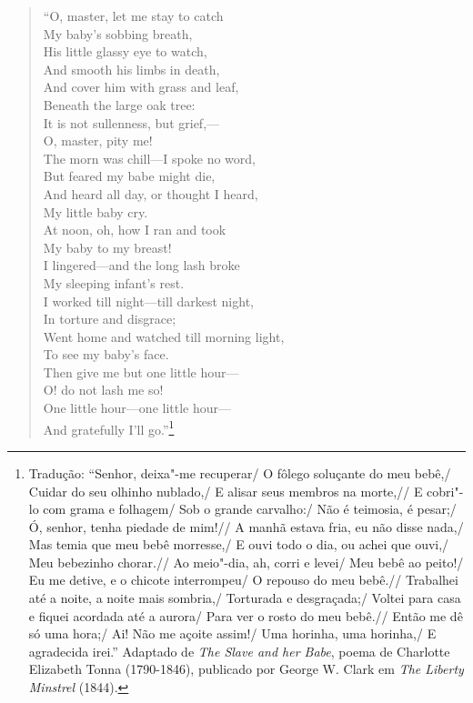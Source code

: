 \begin{verse}
``O, master, let me stay to catch\\
My baby's sobbing breath,\\
His little glassy eye to watch,\\
And smooth his limbs in death,\\[5pt]

And cover him with grass and leaf,\\
Beneath the large oak tree:\\
It is not sullenness, but grief,---\\
O, master, pity me!\\[5pt]

The morn was chill---I spoke no word,\\
But feared my babe might die,\\
And heard all day, or thought I heard,\\
My little baby cry.\\[5pt]

At noon, oh, how I ran and took\\
My baby to my breast!\\
I lingered---and the long lash broke\\
My sleeping infant's rest.\\[5pt]

I worked till night---till darkest night,\\
In torture and disgrace;\\
Went home and watched till morning light,\\
To see my baby's face.\\[5pt]

Then give me but one little hour---\\
O! do not lash me so!\\
One little hour---one little hour---\\
And gratefully I'll go.''\footnote{Tradução: ``Senhor, deixa"-me recuperar/ O fôlego soluçante do meu bebê,/ Cuidar do seu olhinho nublado,/ E alisar seus membros na morte,// E cobri"-lo com grama e folhagem/ Sob o grande carvalho:/ Não é teimosia, é pesar;/ Ó, senhor, tenha piedade de mim!// A manhã estava fria, eu não disse nada,/ Mas temia que meu bebê morresse,/ E ouvi todo o dia, ou achei que ouvi,/ Meu bebezinho chorar.//
Ao meio"-dia, ah, corri e levei/ Meu bebê ao peito!/ Eu me detive, e o chicote interrompeu/ O repouso do meu bebê.// Trabalhei até a noite, a noite mais sombria,/ Torturada e desgraçada;/ 
Voltei para casa e fiquei acordada até a aurora/ Para ver o rosto do meu bebê.// Então me dê só uma hora;/ Ai! Não me açoite assim!/ Uma horinha, uma horinha,/ E agradecida irei.''
Adaptado de \emph{The Slave and her Babe}, poema de Charlotte Elizabeth Tonna
  (1790-1846), publicado por George W. Clark em \emph{The Liberty
  Minstrel} (1844).}
\end{verse}

